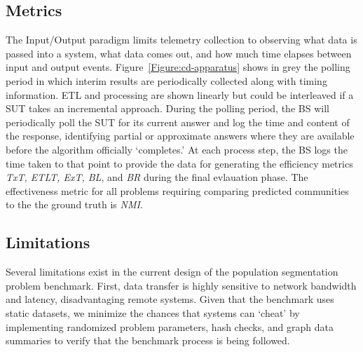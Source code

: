 \subsection{Metrics} 
The Input/Output paradigm limits telemetry collection to observing what data is passed into a system, what data comes out, and how much time elapses between input and output events. 
Figure~\ref{Figure:cd-apparatus} shows in grey the polling period in which interim results are periodically collected along with timing information.
ETL and processing are shown linearly but could be interleaved if a \ac{SUT} takes an incremental approach. 
During the polling period, the \ac{BS} will periodically poll the SUT for its current answer and log the time and content of the response, identifying partial or approximate answers where they are available before the algorithm officially `completes.' 
At each process step, the \ac{BS} logs the time taken to that point to provide the data for generating the efficiency metrics \textit{\ac{TxT}, \ac{ETLT}, \ac{ExT}, \ac{BL}}, and \textit{\ac{BR}} during the final evlauation phase.
The effectiveness metric for all problems requiring comparing predicted communities to the the ground truth is \textit{\ac{NMI}}.
% 
\subsection{Limitations}
Several limitations exist in the current design of the population segmentation problem benchmark. 
First, data transfer is highly sensitive to network bandwidth and latency, disadvantaging remote systems. 
Given that the benchmark uses static datasets, we minimize the chances that systems can `cheat' by implementing randomized problem parameters, hash checks, and graph data summaries to verify that the benchmark process is being followed. 

